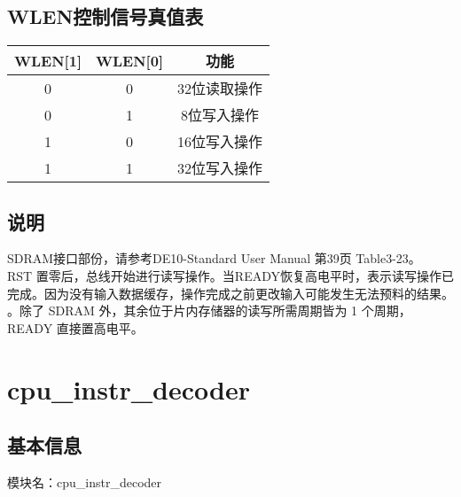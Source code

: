 \subsection{WLEN控制信号真值表}
\begin{tabular}{|c|c|c|}
    \hline
    WLEN[1]  &  WLEN[0] &       功能\\\hline
    0       &   0       &       32位读取操作\\\hline
    0       &   1       &       8位写入操作\\\hline
    1       &   0       &       16位写入操作\\\hline
    1       &   1       &       32位写入操作\\\hline
\end{tabular}
\subsection{说明}
SDRAM接口部份，请参考DE10-Standard User Manual 第39页 Table3-23。\\
 RST 置零后，总线开始进行读写操作。当READY恢复高电平时，表示读写操作已完成。因为没有输入数据缓存，操作完成之前更改输入可能发生无法预料的结果。\\
。除了 SDRAM 外，其余位于片内存储器的读写所需周期皆为 1 个周期，READY 直接置高电平。

\section{cpu\_instr\_decoder}
\subsection{基本信息}
模块名：cpu\_instr\_decoder
